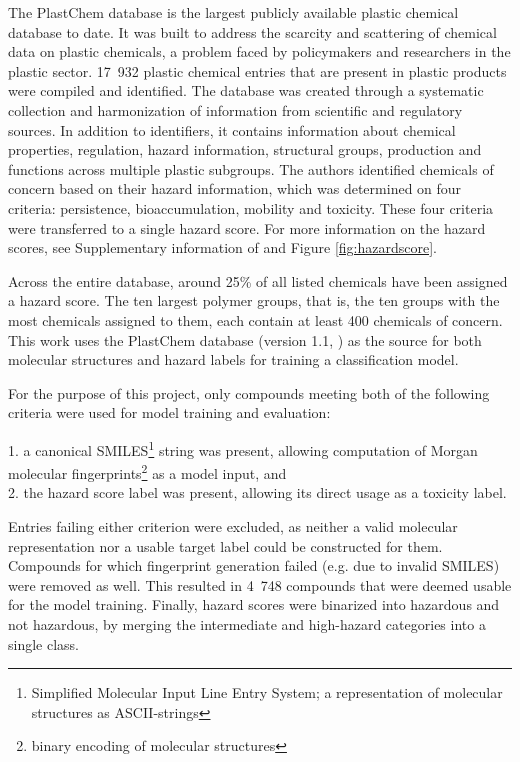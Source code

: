 \documentclass[hidelinks,11pt]{article}
\begin{document}
The PlastChem database \parencite{wagnerStateSciencePlastic2025} is the largest publicly available plastic chemical database to date.
It was built to address the scarcity and scattering of chemical data on plastic chemicals, 
a problem faced by policymakers and researchers in the plastic sector.
17~932 plastic chemical entries that are present in plastic products were compiled and identified.
The database was created through a systematic collection and harmonization of information from 
scientific and regulatory sources.
In addition to identifiers, it contains information about chemical properties, regulation, 
hazard information, structural groups, production and functions across multiple plastic subgroups.
The authors identified chemicals of concern based on their hazard information, which was 
determined on four criteria: persistence, bioaccumulation, mobility and toxicity.
These four criteria were transferred to a single hazard score.
For more information on the hazard scores, see Supplementary information of
\cite{monclusMappingChemicalComplexity2025} and Figure \ref{fig:hazardscore}.

Across the entire database, around 25\% of all listed chemicals have been assigned a hazard score.
The ten largest polymer groups, that is, the ten groups with the most chemicals assigned to them, 
each contain at least 400 chemicals of concern.
This work uses the PlastChem database (version 1.1, \cite{wagnerStateSciencePlastic2025}) as the 
source for both molecular structures and hazard labels for training a classification model.

For the purpose of this project, only compounds meeting both of the following criteria were used for 
model training and evaluation:

1. a canonical SMILES\protect\footnote{Simplified Molecular Input Line Entry System; a 
representation of molecular structures as ASCII-strings} string was present, allowing computation 
of Morgan molecular fingerprints\protect\footnote{binary encoding of molecular structures} \parencite{rogersExtendedConnectivityFingerprints2010}
as a model input, and \\
2. the hazard score label was present, allowing its direct usage as a toxicity label.

Entries failing either criterion were excluded, as neither a valid molecular representation nor a 
usable target label could be constructed for them.
Compounds for which fingerprint generation failed (e.g. due to invalid SMILES) were removed as well.
This resulted in 4~748 compounds that were deemed usable for the model training.
Finally, hazard scores were binarized into hazardous and not hazardous, by merging the intermediate 
and high-hazard categories into a single class.
\end{document}
